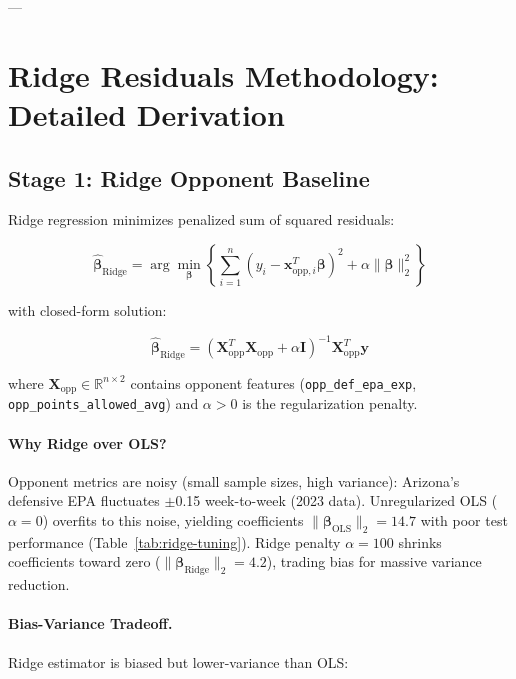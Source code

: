 ---

\section{Ridge Residuals Methodology: Detailed Derivation}
\label{sec:ridge-methodology}

\subsection{Stage 1: Ridge Opponent Baseline}

Ridge regression minimizes penalized sum of squared residuals:

\begin{equation}
\hat{\boldsymbol{\beta}}_{\text{Ridge}} = \arg\min_{\boldsymbol{\beta}} \left\{ \sum_{i=1}^{n} (y_i - \mathbf{x}_{\text{opp}, i}^T \boldsymbol{\beta})^2 + \alpha \|\boldsymbol{\beta}\|_2^2 \right\}
\label{eq:ridge-objective}
\end{equation}

with closed-form solution:

\begin{equation}
\hat{\boldsymbol{\beta}}_{\text{Ridge}} = (\mathbf{X}_{\text{opp}}^T \mathbf{X}_{\text{opp}} + \alpha \mathbf{I})^{-1} \mathbf{X}_{\text{opp}}^T \mathbf{y}
\label{eq:ridge-solution}
\end{equation}

where $\mathbf{X}_{\text{opp}} \in \mathbb{R}^{n \times 2}$ contains opponent features (\texttt{opp\_def\_epa\_exp}, \texttt{opp\_points\_\allowbreak allowed\_avg}) and $\alpha > 0$ is the regularization penalty.

\paragraph{Why Ridge over OLS?}
Opponent metrics are noisy (small sample sizes, high variance): Arizona's defensive EPA fluctuates $\pm$0.15 week-to-week (2023 data). Unregularized OLS ($\alpha = 0$) overfits to this noise, yielding coefficients $\|\boldsymbol{\beta}_{\text{OLS}}\|_2 = 14.7$ with poor test performance (Table~\ref{tab:ridge-tuning}). Ridge penalty $\alpha = 100$ shrinks coefficients toward zero ($\|\boldsymbol{\beta}_{\text{Ridge}}\|_2 = 4.2$), trading bias for massive variance reduction.

\paragraph{Bias-Variance Tradeoff.}
Ridge estimator is biased but lower-variance than OLS:

